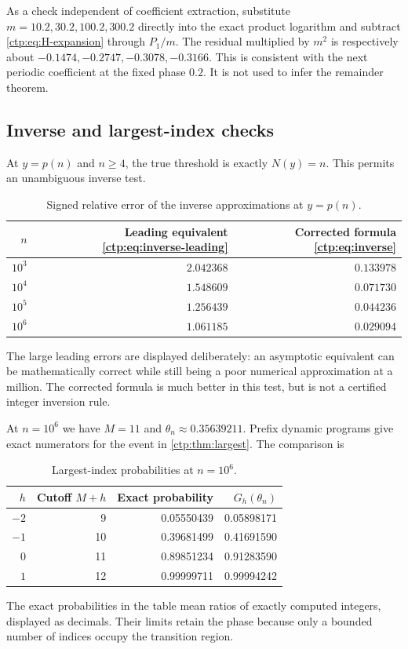 \documentclass[11pt,a4paper]{article}
\numberwithin{equation}{section}
\theoremstyle{definition}
\theoremstyle{remark}
\begin{document}
As a check independent of coefficient extraction, substitute
$m=10.2,30.2,100.2,300.2$ directly into the exact product logarithm and
subtract \eqref{ctp:eq:H-expansion} through $P_1/m$. The residual multiplied
by $m^2$ is respectively about
$-0.1474,-0.2747,-0.3078,-0.3166$. This is consistent with the next
periodic coefficient at the fixed phase $0.2$. It is not used to infer
the remainder theorem.

\subsection{Inverse and largest-index checks}
At $y=p(n)$ and $n\geq4$, the true threshold is exactly $N(y)=n$.
This permits an unambiguous inverse test.

\begin{table}[htbp]
\centering
\caption{Signed relative error of the inverse approximations at $y=p(n)$.}
\label{ctp:tab:inverse}
\begin{tabular}{rrr}
\toprule
$n$ & Leading equivalent \eqref{ctp:eq:inverse-leading} & Corrected formula \eqref{ctp:eq:inverse}\\
\midrule
$10^3$ & $2.042368$ & $0.133978$\\
$10^4$ & $1.548609$ & $0.071730$\\
$10^5$ & $1.256439$ & $0.044236$\\
$10^6$ & $1.061185$ & $0.029094$\\
\bottomrule
\end{tabular}
\end{table}
The large leading errors are displayed deliberately: an asymptotic
equivalent can be mathematically correct while still being a poor
numerical approximation at a million. The corrected formula is much
better in this test, but is not a certified integer inversion rule.

At $n=10^6$ we have $M=11$ and $\theta_n\approx0.35639211$.
Prefix dynamic programs give exact numerators for the event in
\cref{ctp:thm:largest}. The comparison is
\begin{table}[htbp]
\centering
\caption{Largest-index probabilities at $n=10^6$.}
\label{ctp:tab:largest}
\begin{tabular}{rrrr}
\toprule
$h$ & Cutoff $M+h$ & Exact probability & $G_h(\theta_n)$\\
\midrule
$-2$ & 9 & 0.05550439 & 0.05898171\\
$-1$ & 10 & 0.39681499 & 0.41691590\\
$0$ & 11 & 0.89851234 & 0.91283590\\
$1$ & 12 & 0.99999711 & 0.99994242\\
\bottomrule
\end{tabular}
\end{table}
The exact probabilities in the table mean ratios of exactly computed
integers, displayed as decimals. Their limits retain the phase because
only a bounded number of indices occupy the transition region.
\end{document}
